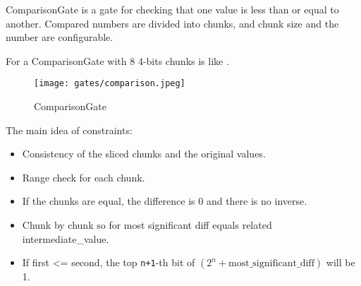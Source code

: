 
\hspace*{\fill}

\indent ComparisonGate is a gate for checking that one value is less than or equal to another. 
Compared numbers are divided into chunks, and chunk size and the number are configurable.

For a ComparisonGate with 8 4-bits chunks is like .

\begin{figure}[!ht]
    \centering
    \texttt{[image: gates/comparison.jpeg]}
    \caption{ComparisonGate}
    \label{fig:comparison}
\end{figure}

The main idea of constraints:
\begin{itemize}
    \item Consistency of the sliced chunks and the original values.
    \item Range check for each chunk.
    \item If the chunks are equal, the difference is 0 and there is no inverse.
    \item Chunk by chunk so for most significant diff equals related intermediate\_value.
    \item If first <= second, the top \verb|n+1|-th bit of $(2^n + \text{most\_significant\_diff})$ will be 1.
\end{itemize}
